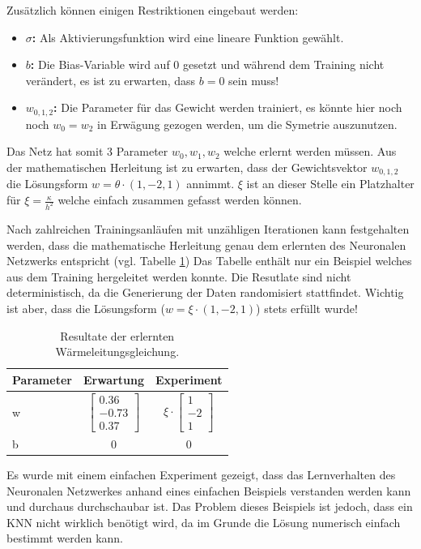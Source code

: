 	Zusätzlich können einigen Restriktionen eingebaut werden:
	\begin{itemize}
		\item {\textbf{$\sigma$:} Als Aktivierungsfunktion wird eine lineare Funktion gewählt.}
		\item {\textbf{$b$: } Die Bias-Variable wird auf 0 gesetzt und während dem Training nicht verändert, es ist zu erwarten, dass $b=0$ sein muss!}
		\item {\textbf{$w_{0,1,2}$: } Die Parameter für das Gewicht werden trainiert, es könnte hier noch noch $w_0 = w_2$ in Erwägung gezogen werden, um die Symetrie auszunutzen.}
	\end{itemize}
	Das Netz hat somit 3 Parameter $w_0, w_1, w_2$ welche erlernt werden müssen. Aus der mathematischen Herleitung ist zu erwarten, dass der Gewichtsvektor $w_{0,1,2}$ die Lösungsform $w = \theta \cdot (1, -2, 1)$ annimmt. $\xi$ ist an dieser Stelle ein Platzhalter für $\xi = \frac{\kappa}{h^{2}}$ welche einfach zusammen gefasst werden können.
	
	
	Nach zahlreichen Trainingsanläufen mit unzähligen Iterationen kann festgehalten werden, dass die mathematische Herleitung genau dem erlernten des Neuronalen Netzwerks entspricht (vgl. Tabelle \ref{tbl:result_heat}) Das Tabelle enthält nur ein Beispiel welches aus dem Training hergeleitet werden konnte. Die Resutlate sind nicht deterministisch, da die Generierung der Daten randomisiert stattfindet. Wichtig ist aber, dass die Lösungsform ($w = \xi \cdot (1, -2, 1)$) stets erfüllt wurde!
	
	\begin{table}[h]
		\centering
		\def\arraystretch{1.1}
		\begin{tabular}{l|c|c}
			Parameter & Erwartung & Experiment \\
			\hline
			w & $\begin{bmatrix} 0.36 \\ -0.73 \\ 0.37 \end{bmatrix}$ & $ \xi \cdot \begin{bmatrix} 1 \\ -2 \\ 1 \end{bmatrix}$ \\
			b & 0 & 0 \\
		\end{tabular}
		\label{tbl:result_heat}
		\caption{Resultate der erlernten Wärmeleitungsgleichung.}
	\end{table}
	
	Es wurde mit einem einfachen Experiment gezeigt, dass das Lernverhalten des Neuronalen Netzwerkes anhand eines einfachen Beispiels verstanden werden kann und durchaus durchschaubar ist. Das Problem dieses Beispiels ist jedoch, dass ein KNN nicht wirklich benötigt wird, da im Grunde die Lösung numerisch einfach bestimmt werden kann.